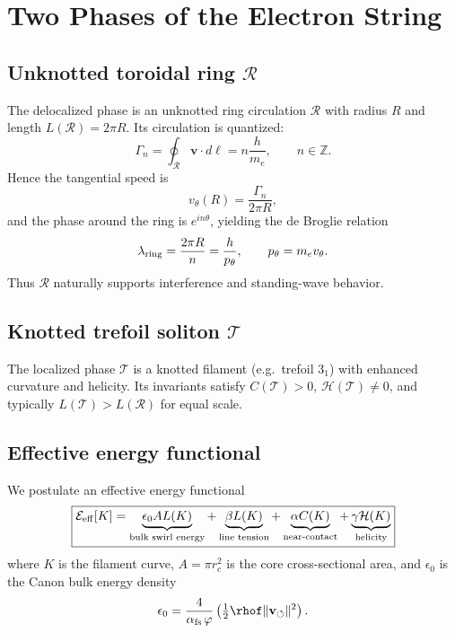 \documentclass[11pt,a4paper]{article}
\begin{document}
\section{Two Phases of the Electron String}

    \subsection{Unknotted toroidal ring $\mathcal R$}

        The delocalized phase is an unknotted ring circulation $\mathcal R$
        with radius $R$ and length $L(\mathcal R)=2\pi R$.
        Its circulation is quantized:
        \begin{equation}
        \Gamma_n = \oint_{\mathcal R} \mathbf v \cdot d\boldsymbol \ell = n \frac{h}{m_e}, \qquad n\in \mathbb Z .
        \end{equation}
        Hence the tangential speed is
        \begin{equation}
        v_\theta(R) = \frac{\Gamma_n}{2\pi R},
        \end{equation}
        and the phase around the ring is $e^{i n\theta}$, yielding the
        de Broglie relation
        \begin{equation}
        \lambda_{\rm ring} = \frac{2\pi R}{n} = \frac{h}{p_\theta}, \qquad p_\theta = m_e v_\theta .
        \end{equation}
        Thus $\mathcal R$ naturally supports interference and standing-wave behavior.

    \subsection{Knotted trefoil soliton $\mathcal T$}

        The localized phase $\mathcal T$ is a knotted filament
        (e.g.\ trefoil $3_1$) with enhanced curvature and helicity.
        Its invariants satisfy $C(\mathcal T)>0$, $\mathcal H(\mathcal T)\neq 0$,
        and typically $L(\mathcal T)>L(\mathcal R)$ for equal scale.

    \subsection{Effective energy functional}

        We postulate an effective energy functional
        \begin{equation}
        \boxed{
            \mathcal E_{\rm eff}[K] =
            \underbrace{\epsilon_0 A L(K)}_{\text{bulk swirl energy}} +
            \underbrace{\beta L(K)}_{\text{line tension}} +
            \underbrace{\alpha C(K)}_{\text{near-contact}} +
            \underbrace{\gamma \mathcal H(K)}_{\text{helicity}}
        }
        \end{equation}
        where $K$ is the filament curve,
        $A=\pi r_c^2$ is the core cross-sectional area,
        and $\epsilon_0$ is the Canon bulk energy density
        \begin{equation}
        \epsilon_0 = \frac{4}{\alpha_{\rm fs}\,\varphi}\left(\tfrac12 \rhof \|\mathbf v_{\circlearrowleft}\|^2\right).
        \end{equation}
\end{document}
